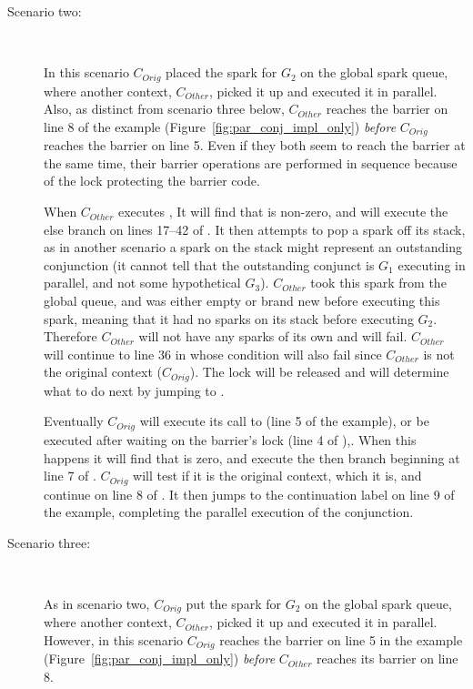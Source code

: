 \begin{description}
    \item[Scenario two:]~

    In this scenario $C_{Orig}$ placed the spark for $G_2$ on the
    global spark queue,
    where another context, $C_{Other}$, picked it up and executed it
    in parallel.
    Also, as distinct from scenario three below,
    $C_{Other}$ reaches the barrier on line 8 of the example 
    (Figure~\ref{fig:par_conj_impl_only})
    \emph{before}
    $C_{Orig}$ reaches the barrier on line 5.
    Even if they both seem to reach the barrier at the same time,
    their barrier operations are performed in sequence because of the
    lock protecting the barrier code.

    When $C_{Other}$ executes \joinandcontinue,
    It will find that  is non-zero,
    and will execute the else branch on lines 17--42 of \joinandcontinue.
    It then attempts to pop a spark off its stack,
    as in another scenario a spark on the stack might represent an
    outstanding conjunction
    (it cannot tell that the outstanding conjunct is $G_1$ executing in
    parallel, and not some hypothetical $G_3$).
    $C_{Other}$ took this spark from the global queue,
    and was either empty or brand new before executing this spark,
    meaning that it had no sparks on its stack before executing $G_2$.
    Therefore $C_{Other}$ will not have any sparks of its own and
     will fail.
    $C_{Other}$ will continue to line 36 in \joinandcontinue
    whose condition will also fail since $C_{Other}$
    is not the original context ($C_{Orig}$).
    The lock will be released and \joinandcontinue will determine what to do
    next by jumping to \idle.

    Eventually $C_{Orig}$ will execute its call to \joinandcontinue
    (line 5 of the example),
    or be executed after waiting on the barrier's lock (line 4 of
    \joinandcontinue),.
    When this happens it will find that 
    is zero,
    and execute the then branch beginning at line 7 of \joinandcontinue.
    $C_{Orig}$ will test if it is the original context,
    which it is,
    and continue on line 8 of \joinandcontinue.
    It then jumps to the continuation label on line 9 of the example,
    completing the parallel execution of the conjunction.

    \item[Scenario three:]~

    As in scenario two, $C_{Orig}$ put the spark for $G_2$ on the global spark
    queue,
    where another context, $C_{Other}$, picked it up and executed it
    in parallel.
    However,
    in this scenario
    $C_{Orig}$ reaches the barrier on line 5 in the example
    (Figure~\ref{fig:par_conj_impl_only})
    \emph{before}
    $C_{Other}$ reaches its barrier on line 8.


\end{description}
